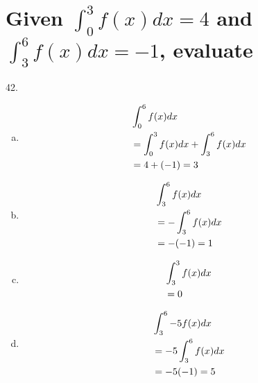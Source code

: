 \documentclass[11pt]{article}
\newcommand*{\set}{\setcounter{equation}{0}}
\begin{document}
\section{Given $\int_{0}^{3}f(x)dx=4$ and $\int_{3}^{6}f(x)dx=-1$, evaluate}
42.\begin{enumerate}[(a)]
    \item
        \begin{align}
            \set
            &\int_{0}^{6}f(x)dx\\
            &=\int_{0}^{3}f(x)dx+\int_{3}^{6}f(x)dx\\
            &=4+(-1)=3
        \end{align}
    \item
        \begin{align}
            \set
            &\int_{3}^{6}f(x)dx\\
            &=-\int_{3}^{6}f(x)dx\\
            &=-(-1)=1
        \end{align}
    \item
        \begin{align}
            \set
            &\int_{3}^{3}f(x)dx\\
            &=0
        \end{align}
    \item
        \begin{align}
            \set
            &\int_{3}^{6}-5f(x)dx\\
            &=-5\int_{3}^{6}f(x)dx\\
            &=-5(-1)=5
        \end{align}
\end{enumerate}
\end{document}

